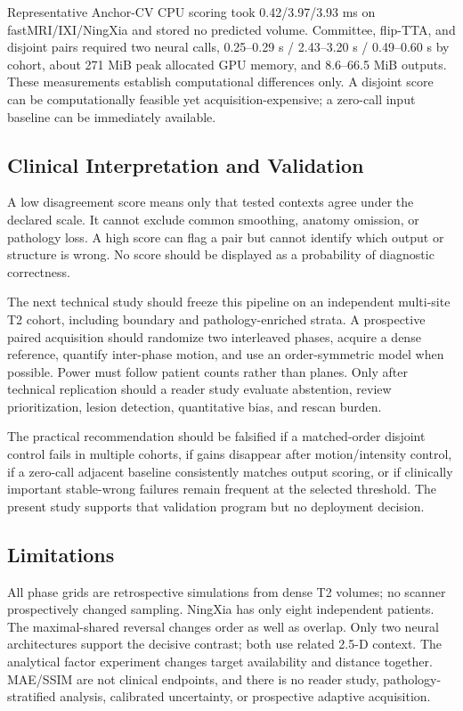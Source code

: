 \documentclass[journal,10pt]{IEEEtran}
\begin{document}
Representative Anchor-CV CPU scoring took 0.42/3.97/3.93 ms on fastMRI/IXI/NingXia and stored no predicted volume. Committee, flip-TTA, and disjoint pairs required two neural calls, 0.25--0.29 s / 2.43--3.20 s / 0.49--0.60 s by cohort, about 271 MiB peak allocated GPU memory, and 8.6--66.5 MiB outputs. These measurements establish computational differences only. A disjoint score can be computationally feasible yet acquisition-expensive; a zero-call input baseline can be immediately available.

\subsection{Clinical Interpretation and Validation}
A low disagreement score means only that tested contexts agree under the declared scale. It cannot exclude common smoothing, anatomy omission, or pathology loss. A high score can flag a pair but cannot identify which output or structure is wrong. No score should be displayed as a probability of diagnostic correctness.

The next technical study should freeze this pipeline on an independent multi-site T2 cohort, including boundary and pathology-enriched strata. A prospective paired acquisition should randomize two interleaved phases, acquire a dense reference, quantify inter-phase motion, and use an order-symmetric model when possible. Power must follow patient counts rather than planes. Only after technical replication should a reader study evaluate abstention, review prioritization, lesion detection, quantitative bias, and rescan burden.

The practical recommendation should be falsified if a matched-order disjoint control fails in multiple cohorts, if gains disappear after motion/intensity control, if a zero-call adjacent baseline consistently matches output scoring, or if clinically important stable-wrong failures remain frequent at the selected threshold. The present study supports that validation program but no deployment decision.

\subsection{Limitations}
All phase grids are retrospective simulations from dense T2 volumes; no scanner prospectively changed sampling. NingXia has only eight independent patients. The maximal-shared reversal changes order as well as overlap. Only two neural architectures support the decisive contrast; both use related 2.5-D context. The analytical factor experiment changes target availability and distance together. MAE/SSIM are not clinical endpoints, and there is no reader study, pathology-stratified analysis, calibrated uncertainty, or prospective adaptive acquisition.
\end{document}
